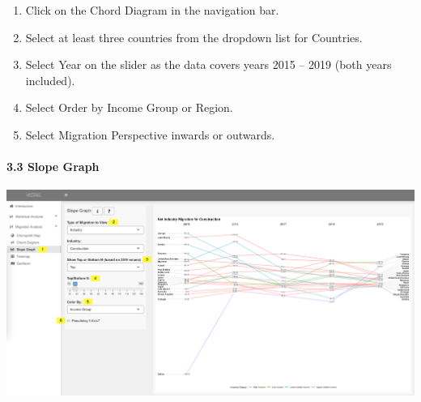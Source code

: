 \documentclass[
]{article}
\providecommand{\tightlist}{%
  \setlength{\itemsep}{0pt}\setlength{\parskip}{0pt}}
\begin{document}
\begin{enumerate}
\def\labelenumi{\arabic{enumi}.}
\tightlist
\item
  Click on the Chord Diagram in the navigation bar.
\item
  Select at least three countries from the dropdown list for Countries.
\item
  Select Year on the slider as the data covers years 2015 -- 2019 (both
  years included).
\item
  Select Order by Income Group or Region.
\item
  Select Migration Perspective inwards or outwards.
\end{enumerate}

\hypertarget{slope-graph}{%
\paragraph{3.3 Slope Graph}\label{slope-graph}}

\includegraphics{images/12-slope.png}
\end{document}
